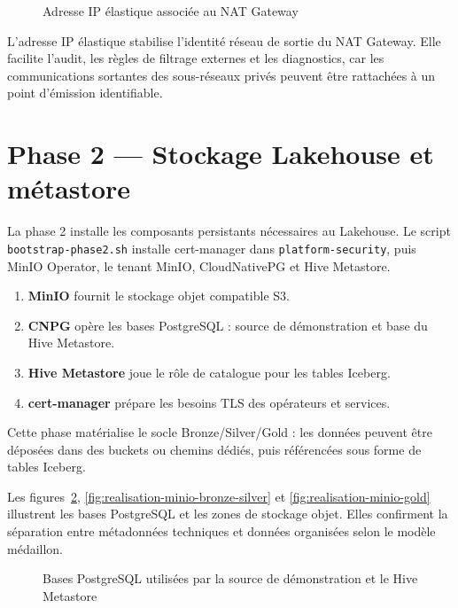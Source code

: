 \begin{figure}[H]
\centering
{}
\caption{Adresse IP élastique associée au NAT Gateway}
\label{fig:realisation-elastic-ip-nat}
\end{figure}

L'adresse IP élastique stabilise l'identité réseau de sortie du NAT Gateway. Elle facilite l'audit, les règles de filtrage externes et les diagnostics, car les communications sortantes des sous-réseaux privés peuvent être rattachées à un point d'émission identifiable.

\section{Phase 2 — Stockage Lakehouse et métastore}

La phase 2 installe les composants persistants nécessaires au Lakehouse. Le script \texttt{bootstrap-phase2.sh} installe cert-manager dans \texttt{platform-security}, puis MinIO Operator, le tenant MinIO, CloudNativePG et Hive Metastore.

\begin{enumerate}
    \item \textbf{MinIO} fournit le stockage objet compatible S3.
    \item \textbf{CNPG} opère les bases PostgreSQL : source de démonstration et base du Hive Metastore.
    \item \textbf{Hive Metastore} joue le rôle de catalogue pour les tables Iceberg.
    \item \textbf{cert-manager} prépare les besoins TLS des opérateurs et services.
\end{enumerate}

Cette phase matérialise le socle Bronze/Silver/Gold : les données peuvent être déposées dans des buckets ou chemins dédiés, puis référencées sous forme de tables Iceberg.

Les figures~\ref{fig:realisation-postgres-hive-metastore}, \ref{fig:realisation-minio-bronze-silver} et \ref{fig:realisation-minio-gold} illustrent les bases PostgreSQL et les zones de stockage objet. Elles confirment la séparation entre métadonnées techniques et données organisées selon le modèle médaillon.

\begin{figure}[H]
\centering
{}
\caption{Bases PostgreSQL utilisées par la source de démonstration et le Hive Metastore}
\label{fig:realisation-postgres-hive-metastore}
\end{figure}

